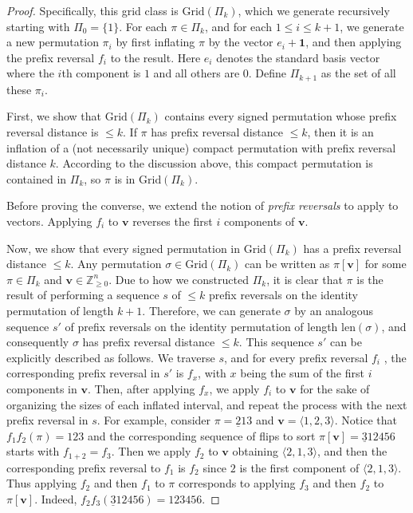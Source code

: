 \documentclass{article}
\numberwithin{equation}{section}
\theoremstyle{definition}
\newcommand{\V}{\textbf{v}}
\newcommand{\one}{\textbf{1}}
\newcommand{\Grid}{\text{Grid}}
\newcommand{\len}{\text{len}}
\begin{document}
\begin{proof}
Specifically, this grid class is $\Grid(\Pi_k)$, which we generate recursively starting with $\Pi_0 = \{1\}$.  For each $\pi\in\Pi_k$, and for each $1\leq i \leq k+1$, we generate a new permutation $\pi_i$ by first inflating $\pi$ by the vector $e_i + \one$, and then applying the prefix reversal $f_i$ to the result.  Here $e_i$ denotes the standard basis vector where the $i$th component is $1$ and all others are $0$. Define $\Pi_{k+1}$ as the set of all these $\pi_i$.

First, we show that $\Grid(\Pi_k)$ contains every signed permutation whose prefix reversal distance is $\leq k$.  If $\pi$ has prefix reversal distance $\leq k$, then it is an inflation of a (not necessarily unique) compact permutation with prefix reversal distance $k$.  According to the discussion above, this compact permutation is contained in $\Pi_k$, so $\pi$ is in $\Grid(\Pi_k)$.

Before proving the converse, we extend the notion of \emph{prefix reversals} to apply to vectors. Applying $f_i$ to $\V$ reverses the first $i$ components of $\V$.

Now, we show that every signed permutation in $\Grid(\Pi_k)$ has a prefix reversal distance $\leq k$.  Any permutation $\sigma\in\Grid(\Pi_k)$ can be written as $\pi[\V]$ for some $\pi\in\Pi_k$ and $\V\in\mathbb{Z}^{n}_{\geq0}$.  Due to how we constructed $\Pi_k$, it is clear that $\pi$ is the result of performing a sequence $s$ of $\leq k$ prefix reversals on the identity permutation of length $k+1$.  Therefore, we can generate $\sigma$ by an analogous sequence $s'$ of prefix reversals on the identity permutation of length $\len(\sigma)$, and consequently $\sigma$ has prefix reversal distance $\leq k$.  This sequence $s'$ can be explicitly described as follows.  We traverse $s$, and for every prefix reversal $f_i$ , the corresponding prefix reversal in $s'$ is $f_x$, with $x$ being the sum of the first $i$ components in $\V$.  Then, after applying $f_x$, we apply $f_i$ to $\V$ for the sake of organizing the sizes of each inflated interval, and repeat the process with the next prefix reversal in $s$. For example, consider $\pi=\underline{2}13$ and $\V=\langle 1,2,3\rangle$. Notice that $f_1f_2(\pi)=123$ and the corresponding sequence of flips to sort $\pi[\V]=\underline{3}12456$ starts with $f_{1+2}=f_3$. Then we apply $f_2$ to $\V$ obtaining $\langle 2,1,3\rangle$, and then the corresponding prefix reversal to $f_1$ is $f_2$ since $2$ is the first component of $\langle 2,1,3\rangle$. Thus applying $f_2$ and then $f_1$ to $\pi$ corresponds to applying $f_3$ and then $f_2$ to $\pi[\V]$. Indeed, $f_2f_3(\underline{3}12456)=123456$.
\end{proof}
\end{document}

